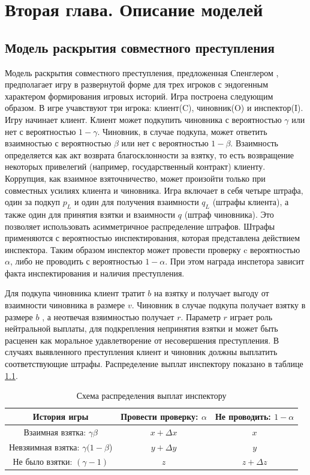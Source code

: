 \chapter{Вторая глава. Описание моделей}
\label{cha:ch_2}
\section{Модель раскрытия совместного преступления}
Модель раскрытия совместного преступления, предложенная Спенглером \cite{Spengler}, предполагает игру в развернутой форме для трех игроков с эндогенным характером формирования игровых историй.
Игра построена следующим образом. В игре учавствуют три игрока: клиент(C), чиновник(O) и инспектор(I). Игру начинает клиент. Клиент может подкупить чиновника с вероятностью $\gamma$ или нет с вероятностью $1 - \gamma$. Чиновник, в случае подкупа, может ответить взаимностью с вероятностью $\beta$ или нет с вероятностью $1 - \beta$. Взаимность определяется как акт возврата благосклонности за взятку, то есть возвращение некоторых привелегий (например, государственный контракт) клиенту. Коррупция, как взаимное взяточничество, может произойти только при совместных усилиях клиента и чиновника. Игра включает в себя четыре штрафа, один за подкуп $p_L$ и один для получения взаимности $q_L$ (штрафы клиента), а также один для принятия взятки и взаимности $q$ (штраф чиновника). Это позволяет использовать асимметричное распределение штрафов. Штрафы применяются с вероятностью инспектирования, которая представлена действием инспектора. Таким образом инспектор может провести проверку c вероятностью $\alpha$, либо не проводить с вероятностью $1 - \alpha$. При этом награда инспетора зависит факта инспектирования и наличия преступления. 
\par 
Для подкупа чиновника клиент тратит $b$ на взятку и получает выгоду от взаимности чиновника в размере $v$. Чиновник в случае подкупа получает взятку в размере $b$ , а неотвечая взяимностью получает $r$. Параметр $r$ играет роль нейтральной выплаты, для подкрепления непринятия взятки и может быть расценен как моральное удавлетворение от несовершения преступления. В случаях выявленного преступления клиент и чиновник должны выплатить соответствующие штрафы. 
Распределение выплат инспектору показано в таблице \ref{tbl:inspr1}.
\begin{table}[H]
	\centering
	\begin{tabular}[t]{|c|c|c|}
		\hline
		История игры & Провести проверку: $\alpha$ & Не проводить: $1-\alpha$ \\
		\hline
		Взаимная взятка: $\gamma \beta$ & $x + \Delta x$ & $x$ \\
		\hline
		Невзяимная взятка: $\gamma (1 - \beta$) &  $y + \Delta y$ & $y$ \\
		\hline
		Не было взятки: $(\gamma - 1)$ &  $z$ & $z + \Delta z$ \\
		\hline
	\end{tabular}
	\caption{\centering Схема распределения выплат инспектору}
	\label{tbl:inspr1}
\end{table}

